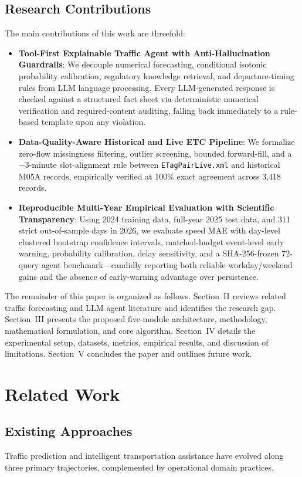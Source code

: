 \documentclass[conference]{IEEEtran}
\begin{document}
\subsection{Research Contributions}
The main contributions of this work are threefold:
\begin{itemize}
    \item \textbf{Tool-First Explainable Traffic Agent with Anti-Hallucination Guardrails}: We decouple numerical forecasting, conditional isotonic probability calibration, regulatory knowledge retrieval, and departure-timing rules from LLM language processing. Every LLM-generated response is checked against a structured fact sheet via deterministic numerical verification and required-content auditing, falling back immediately to a rule-based template upon any violation.
    \item \textbf{Data-Quality-Aware Historical and Live ETC Pipeline}: We formalize zero-flow missingness filtering, outlier screening, bounded forward-fill, and a $-3$-minute slot-alignment rule between \texttt{ETagPairLive.xml} and historical M05A records, empirically verified at 100\% exact agreement across 3,418 records.
    \item \textbf{Reproducible Multi-Year Empirical Evaluation with Scientific Transparency}: Using 2024 training data, full-year 2025 test data, and 311 strict out-of-sample days in 2026, we evaluate speed MAE with day-level clustered bootstrap confidence intervals, matched-budget event-level early warning, probability calibration, delay sensitivity, and a SHA-256-frozen 72-query agent benchmark---candidly reporting both reliable workday/weekend gains and the absence of early-warning advantage over persistence.
\end{itemize}

The remainder of this paper is organized as follows. Section~II reviews related traffic forecasting and LLM agent literature and identifies the research gap. Section~III presents the proposed five-module architecture, methodology, mathematical formulation, and core algorithm. Section~IV details the experimental setup, datasets, metrics, empirical results, and discussion of limitations. Section~V concludes the paper and outlines future work.

\section{Related Work}

\subsection{Existing Approaches}
Traffic prediction and intelligent transportation assistance have evolved along three primary trajectories, complemented by operational domain practices.
\end{document}
